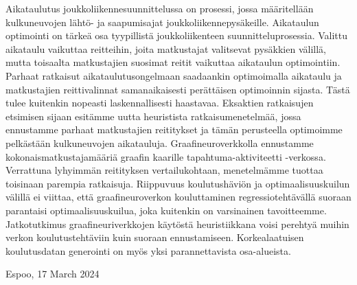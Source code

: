 \documentclass[english, 12pt, a4paper, sci, utf8, a-2b, online]{aaltothesis}
\date{17 March 2024}
\begin{document}
\makecoverpage
\makecopyrightpage
\clearpage

\begin{abstractpage}[english]
    \abstracttext{}
\end{abstractpage}


\newpage
{}
\date{17.3.2024}
\begin{abstractpage}[finnish]
    Aikataulutus joukkoliikennesuunnittelussa on prosessi, jossa määritellään kulkuneuvojen lähtö- ja saapumisajat joukkoliikennepysäkeille. Aikataulun optimointi on tärkeä osa tyypillistä joukkoliikenteen suunnitteluprosessia. Valittu aikataulu vaikuttaa reitteihin, joita matkustajat valitsevat pysäkkien välillä, mutta toisaalta matkustajien suosimat reitit vaikuttaa aikataulun optimointiin. Parhaat ratkaisut aikataulutusongelmaan saadaankin optimoimalla aikataulu ja matkustajien reittivalinnat samanaikaisesti perättäisen optimoinnin sijasta. Tästä tulee kuitenkin nopeasti laskennallisesti haastavaa. Eksaktien ratkaisujen etsimisen sijaan esitämme uutta heuristista ratkaisumenetelmää, jossa ennustamme parhaat matkustajien reititykset ja tämän perusteella optimoimme pelkästään kulkuneuvojen aikatauluja. Graafineuroverkkolla ennustamme kokonaismatkustajamääriä graafin kaarille tapahtuma-aktiviteetti -verkossa. Verrattuna lyhyimmän reitityksen vertailukohtaan, menetelmämme tuottaa toisinaan parempia ratkaisuja. Riippuvuus koulutushäviön ja optimaalisuuskuilun välillä ei viittaa, että graafineuroverkon kouluttaminen regressiotehtävällä suoraan parantaisi optimaalisuuskuilua, joka kuitenkin on varsinainen tavoitteemme. Jatkotutkimus graafineuriverkkojen käytöstä heuristiikkana voisi perehtyä muihin verkon koulutustehtäviin kuin suoraan ennustamiseen. Korkealaatuisen koulutusdatan generointi on myös yksi parannettavista osa-alueista.
\end{abstractpage}


\newpage


\dothesispagenumbering{}


\vspace{5cm}
Espoo, 17 March 2024\\
\end{document}

